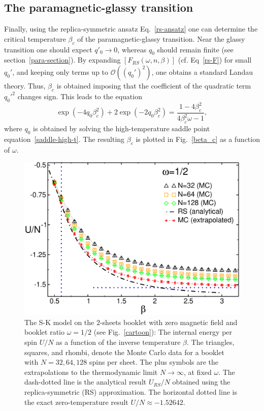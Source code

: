 \documentclass[twocolumn,superscriptaddress,prb,10pt]{revtex4-1}
\begin{document}
\subsection{The paramagnetic-glassy transition}

Finally, using the replica-symmetric ansatz Eq.~\eqref{rs-ansatz} one can determine 
the critical temperature $\beta_c$ of the paramagnetic-glassy transition. 
Near the glassy transition one should expect $q'_0\to0$, whereas $q_0$ 
should remain finite (see section~\ref{para-section}). By expanding $[F_{RS}(\omega,n,\beta)]$ 
(cf. Eq~\eqref{rs-F}) for small $q_0'$, and keeping only terms up to ${\mathcal O}((q_0')^2)$, 
one obtains a standard Landau theory. Thus, $\beta_c$ is obtained imposing that the 
coefficient of the quadratic term $q_0'^2$ changes sign. This leads to the equation 
%
\begin{equation}
\exp(-4q_0\beta^2_c)+2\exp(-2q_0\beta^2_c)=\frac{1-4\beta^2_c}
{4\beta^2_c\omega-1},
\label{tc}
\end{equation}
%
where $q_0$ is obtained by solving the high-temperature saddle point equation~\eqref{saddle-high-t}. 
The resulting $\beta_c$ is plotted in Fig.~\ref{beta_c} as a function of $\omega$. 

\begin{figure}[t]
\includegraphics*[width=0.93\linewidth]{./draft_figs/U_w05}
\caption{
 The S-K model on the $2$-sheets booklet with zero magnetic field and 
 booklet ratio $\omega=1/2$ (see Fig.~\ref{cartoon}): The internal energy 
 per spin $U/N$ as a function of the inverse temperature $\beta$. The triangles, 
 squares, and rhombi, denote the Monte Carlo data for a booklet with 
 $N=32,64,128$ spins per sheet. The plus symbols are the extrapolations to the 
 thermodynamic limit $N\to\infty$, at fixed $\omega$. The dash-dotted line is the 
 analytical result $U_{RS}/N$ obtained using the replica-symmetric (RS) approximation. 
 The horizontal dotted line is the exact zero-temperature result $U/N\approx-1.52642$.
}
\label{U-MC}
\end{figure}
\end{document}
